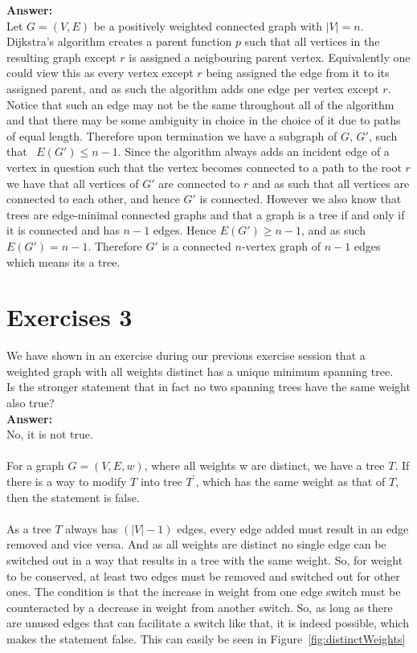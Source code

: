 \documentclass[nobib]{tufte-handout}
\newcounter{counter}
\begin{document}
  \textbf{Answer:} \\ 
  Let $G = (V, E)$ be a positively weighted connected graph with $|V| = n$. Dijkstra's algorithm creates a parent function $p$ such that all vertices in the resulting graph except $r$ is assigned a neigbouring parent vertex. Equivalently one could view this as every vertex except $r$ being assigned the edge from it to its assigned parent, and as such the algorithm adds one edge per vertex except $r$. Notice that such an edge may not be the same throughout all of the algorithm and that there may be some ambiguity in choice in the choice of it due to paths of equal length. Therefore upon termination we have a subgraph of $G$, $G'$, such that \ $E(G') \leq n - 1$. Since the algorithm always adds an incident edge of a vertex in question such that the vertex becomes connected to a path to the root $r$ we have that all vertices of $G'$ are connected to $r$ and as such that all vertices are connected to each other, and hence $G'$ is connected. However we also know that trees are edge-minimal connected graphs and that a graph is a tree if and only if it is connected and has $n - 1$ edges. Hence $E(G') \geq n - 1$, and as such $E(G') = n - 1$. Therefore $G'$ is a connected $n$-vertex graph of $n - 1$ edges which means its a tree.
\newpage

\section{Exercises 3}
We have shown in an exercise during our previous exercise session that a weighted graph with all weights distinct has a unique minimum spanning tree. \\  

Is the stronger statement that in fact no two spanning trees have the same weight also true? \\

\textbf{Answer:} \\ 
No, it is not true.
\\\\
For a graph $G = (V,E,w)$, where all weights w are distinct, we have a tree $T$. If there is a way to modify $T$ into tree $T^\prime$, which has the same weight as that of $T$, then the statement is false. 
\\\\
As a tree $T$ always has $(|V|-1)$ edges, every edge added must result in an edge removed and vice versa. And as all weights are distinct no single edge can be switched out in a way that results in a tree with the same weight. So, for weight to be conserved, at least two edges must be removed and switched out for other ones. The condition is that the increase in weight from one edge switch must be counteracted by a decrease in weight from another switch. So, as long as there are unused edges that can facilitate a switch like that, it is indeed possible, which makes the statement false. This can easily be seen in Figure~\ref{fig:distinctWeights}
\end{document}
